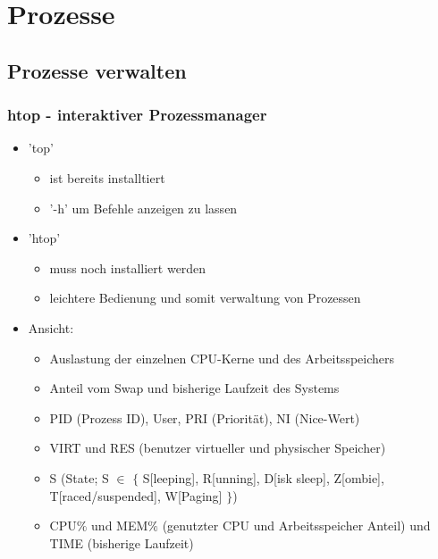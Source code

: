 \documentclass[12pt,utf8]{beamer}
\begin{document}
\section{Prozesse}
\subsection{Prozesse verwalten}
\begin{frame}
\frametitle{htop - interaktiver Prozessmanager}
\begin{itemize}
	\item 'top'
	\begin{itemize}[<+->]
		\item ist bereits installtiert
		\item '-h' um Befehle anzeigen zu lassen
	\end{itemize}
	\item 'htop'
	\begin{itemize}[<+->]
		\item muss noch installiert werden
		\item leichtere Bedienung und somit verwaltung von Prozessen
	\end{itemize}
	\item Ansicht:
	\begin{itemize}[<+->]
		\item Auslastung der einzelnen CPU-Kerne und des Arbeitsspeichers
		\item Anteil vom Swap und bisherige Laufzeit des Systems
		\item PID (Prozess ID), User, PRI (Priorität), NI (Nice-Wert)
		\item VIRT und RES (benutzer virtueller und physischer Speicher)
		\item S (State; S $\in$ $\{$ S[leeping], R[unning], D[isk sleep], Z[ombie], T[raced/suspended], W[Paging] $\}$)
		\item CPU$\%$ und MEM$\%$ (genutzter CPU und Arbeitsspeicher Anteil) und TIME (bisherige Laufzeit)
	\end{itemize}
\end{itemize}
\end{frame}
\end{document}
